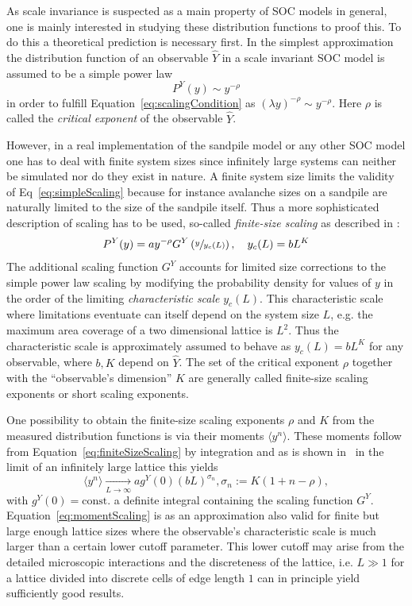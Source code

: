As scale invariance is suspected as a main property of SOC models in general, one is mainly interested in studying
these distribution functions to proof this. To do this a theoretical prediction is necessary first.
In the simplest approximation the distribution function of an observable $\hat{Y}$ in a scale invariant SOC model
is assumed to be a simple power law
\begin{equation}\label{eq:simpleScaling}
P^{Y}(y) \sim y^{-\rho}
\end{equation}
in order to fulfill Equation~\eqref{eq:scalingCondition} as $(\lambda y)^{-\rho}\sim y^{-\rho}$.
Here $\rho$ is called the \emph{critical exponent} of the observable $\hat{Y}$.

However, in a real implementation of the sandpile model or any other SOC model one has to deal with finite system sizes
since infinitely large systems can neither be simulated nor do they exist in nature.
A finite system size limits the validity of Eq~\eqref{eq:simpleScaling} because for instance avalanche sizes on a
sandpile are naturally limited to the size of the sandpile itself. Thus a more sophisticated description of scaling
has to be used, so-called \emph{finite-size scaling} as described in \cite{SOC-book}:
\begin{equation}\label{eq:finiteSizeScaling}
P^{Y}(y) = a y^{-\rho} G^{Y}\left(\sfrac{y}{y_c(L)}\right), \quad y_c(L)=b L^K
\end{equation}
The additional scaling function $G^{Y}$ accounts for limited size corrections to the simple power law scaling
by modifying the probability density for values of $y$ in the order of the limiting \emph{characteristic scale}
$y_c(L)$. This characteristic scale where limitations eventuate can itself depend on the system size $L$,
e.g. the maximum area coverage of a two dimensional lattice is $L^2$. Thus the characteristic scale is approximately
assumed to behave as $y_c(L)=b L^K$ for any observable, where $b,K$ depend on $\hat{Y}$.
The set of the critical exponent $\rho$ together with the \enquote{observable's dimension} $K$ are
generally called finite-size scaling exponents or short scaling exponents.

One possibility to obtain the finite-size scaling exponents $\rho$ and $K$ from the measured distribution functions
is via their moments $\langle y^n\rangle$. These moments follow from Equation~\eqref{eq:finiteSizeScaling} by integration
and as is shown in~\cite{SOC-book} in the limit of an infinitely large lattice this yields
\begin{equation}\label{eq:momentScaling}
\langle y^n\rangle \xrightarrow[L\to\infty]{} a g^{Y}(0) (bL)^{\sigma_n}, \sigma_n := K(1+n-\rho),
\end{equation}
with $g^{Y}(0)=\mathrm{const.}$ a definite integral containing the scaling function $G^{Y}$.
Equation~\ref{eq:momentScaling} is as an approximation also valid for finite but large enough lattice sizes where
the observable's characteristic scale is much larger than a certain lower cutoff parameter. This lower cutoff may arise
from the detailed microscopic interactions and the discreteness of the lattice, i.e. $L \gg 1$ for a lattice divided
into discrete cells of edge length $1$ can in principle yield sufficiently good results.

